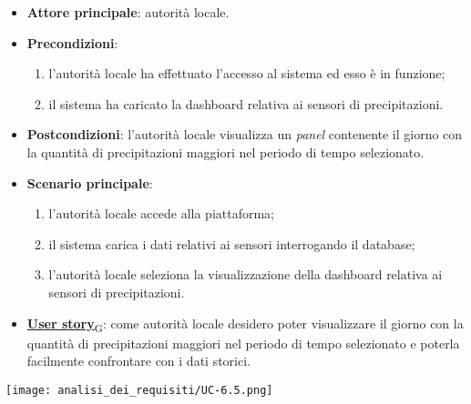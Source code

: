 \begin{itemize}
	\item \textbf{Attore principale}: autorità locale.
	\item \textbf{Precondizioni}:
	      \begin{enumerate}
		      \item l'autorità locale ha effettuato l'accesso al sistema ed esso è in funzione;
		      \item il sistema ha caricato la dashboard relativa ai sensori di precipitazioni.
	      \end{enumerate}
	\item \textbf{Postcondizioni}: l'autorità locale visualizza un \textit{panel} contenente il giorno con la quantità di precipitazioni maggiori nel periodo di tempo selezionato.
	\item \textbf{Scenario principale}:
	      \begin{enumerate}
		      \item l'autorità locale accede alla piattaforma;
		      \item il sistema carica i dati relativi ai sensori interrogando il database;
		      \item l'autorità locale seleziona la visualizzazione della dashboard relativa ai sensori di precipitazioni.
	      \end{enumerate}
	\item \href{https://7last.github.io/docs/rtb/documentazione-interna/glossario\#user-story}{\textbf{User story}\textsubscript{G}}:
	      come autorità locale desidero poter visualizzare il giorno con la quantità di precipitazioni maggiori nel periodo di tempo selezionato
	      e poterla facilmente confrontare con i dati storici.
\end{itemize}
\begin{center}
	\texttt{[image: analisi\_dei\_requisiti/UC-6.5.png]}
\end{center}


